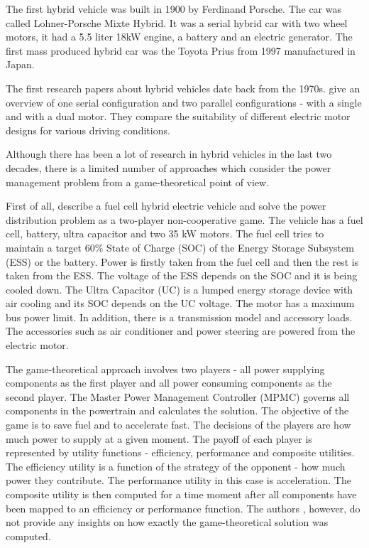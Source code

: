 The first hybrid vehicle was built in 1900 by Ferdinand Porsche. The car was called Lohner-Porsche Mixte Hybrid. It was a serial hybrid car with two wheel motors, it had a 5.5 liter 18kW engine, a battery and an electric generator. The first mass produced hybrid car was the Toyota Prius from 1997 manufactured in Japan.

The first research papers about hybrid vehicles date back from the 1970s. \citet{lafrance1973electrical} give an overview of one serial configuration and two parallel configurations - with a single and with a dual motor. They compare the suitability of different electric motor designs for various driving conditions.

Although there has been a lot of research in hybrid vehicles in the last two decades, there is a limited number of approaches which consider the power management problem from a game-theoretical point of view.


First of all, \citet{gielniak2004power} describe a fuel cell hybrid electric vehicle and solve the power distribution problem as a two-player non-cooperative game. The vehicle has a fuel cell, battery, ultra capacitor and two 35 kW motors. The fuel cell tries to maintain a target 60\% State of Charge (SOC) of the Energy Storage Subsystem (ESS) or the battery. Power is firstly taken from the fuel cell and then the rest is taken from the ESS. The voltage of the ESS depends on the SOC and it is being cooled down. The Ultra Capacitor (UC) is a lumped energy storage device with air cooling and its SOC depends on the UC voltage. The motor has a maximum bus power limit. In addition, there is a transmission model and accessory loads. The accessories such as air conditioner and power steering are powered from the electric motor.

The game-theoretical approach involves two players - all power supplying components as the first player and all power consuming components as the second player. The Master Power Management Controller (MPMC) governs all components in the powertrain and calculates the solution. The objective of the game is to save fuel and to accelerate fast. The decisions of the players are how much power to supply at a given moment. The payoff of each player is represented by utility functions - efficiency, performance and composite utilities. The efficiency utility is a function of the strategy of the opponent - how much power they contribute. The performance utility in this case is acceleration. The composite utility is then computed for a time moment after all components have been mapped to an efficiency or performance function. The authors \citet{gielniak2004power}, however, do not provide any insights on how exactly the game-theoretical solution was computed.

